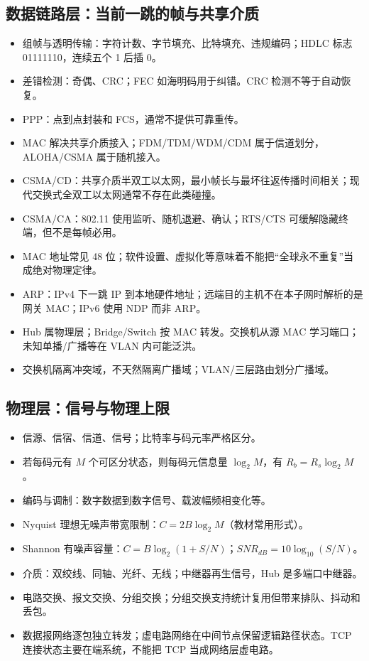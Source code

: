 \documentclass[11pt,a4paper,openany]{ctexbook}
\begin{document}
\subsection{数据链路层：当前一跳的帧与共享介质}
\begin{itemize}
  \item 组帧与透明传输：字符计数、字节填充、比特填充、违规编码；HDLC 标志 01111110，连续五个 1 后插 0。
  \item 差错检测：奇偶、CRC；FEC 如海明码用于纠错。CRC 检测不等于自动恢复。
  \item PPP：点到点封装和 FCS，通常不提供可靠重传。
  \item MAC 解决共享介质接入；FDM/TDM/WDM/CDM 属于信道划分，ALOHA/CSMA 属于随机接入。
  \item CSMA/CD：共享介质半双工以太网，最小帧长与最坏往返传播时间相关；现代交换式全双工以太网通常不存在此类碰撞。
  \item CSMA/CA：802.11 使用监听、随机退避、确认；RTS/CTS 可缓解隐藏终端，但不是每帧必用。
  \item MAC 地址常见 48 位；软件设置、虚拟化等意味着不能把“全球永不重复”当成绝对物理定律。
  \item ARP：IPv4 下一跳 IP 到本地硬件地址；远端目的主机不在本子网时解析的是网关 MAC；IPv6 使用 NDP 而非 ARP。
  \item Hub 属物理层；Bridge/Switch 按 MAC 转发。交换机从源 MAC 学习端口；未知单播/广播等在 VLAN 内可能泛洪。
  \item 交换机隔离冲突域，不天然隔离广播域；VLAN/三层路由划分广播域。
\end{itemize}

\subsection{物理层：信号与物理上限}
\begin{itemize}
  \item 信源、信宿、信道、信号；比特率与码元率严格区分。
  \item 若每码元有 $M$ 个可区分状态，则每码元信息量 $\log_2M$，有 $R_b=R_s\log_2M$。
  \item 编码与调制：数字数据到数字信号、载波幅频相变化等。
  \item Nyquist 理想无噪声带宽限制：$C=2B\log_2M$（教材常用形式）。
  \item Shannon 有噪声容量：$C=B\log_2(1+S/N)$；$SNR_{dB}=10\log_{10}(S/N)$。
  \item 介质：双绞线、同轴、光纤、无线；中继器再生信号，Hub 是多端口中继器。
  \item 电路交换、报文交换、分组交换；分组交换支持统计复用但带来排队、抖动和丢包。
  \item 数据报网络逐包独立转发；虚电路网络在中间节点保留逻辑路径状态。TCP 连接状态主要在端系统，不能把 TCP 当成网络层虚电路。
\end{itemize}
\end{document}
